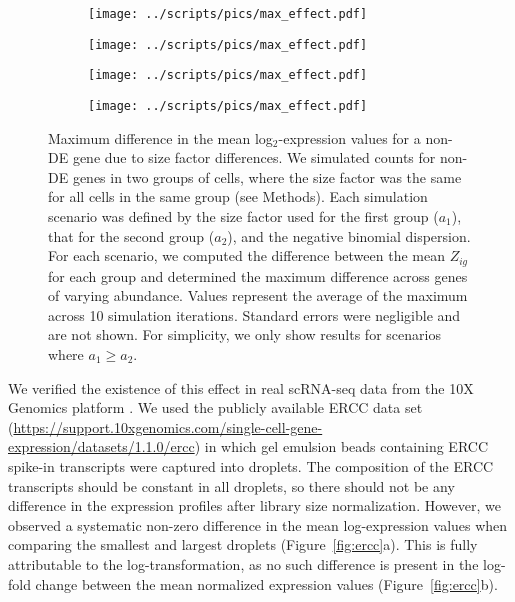 \documentclass[10pt,letterpaper]{article}
\begin{document}
\begin{figure}[btp]
\centering
\begin{subfigure}[b]{0.49\textwidth}
    \texttt{[image: ../scripts/pics/max\_effect.pdf]}
    \caption{}
\end{subfigure}
\begin{subfigure}[b]{0.49\textwidth}
    \texttt{[image: ../scripts/pics/max\_effect.pdf]}
    \caption{}
\end{subfigure}
\begin{subfigure}[b]{0.49\textwidth}
    \texttt{[image: ../scripts/pics/max\_effect.pdf]}
    \caption{}
\end{subfigure}
\begin{subfigure}[b]{0.49\textwidth}
    \texttt{[image: ../scripts/pics/max\_effect.pdf]}
    \caption{}
\end{subfigure}
\caption{Maximum difference in the mean log$_2$-expression values for a non-DE gene due to size factor differences.
We simulated counts for non-DE genes in two groups of cells, where the size factor was the same for all cells in the same group (see Methods).
Each simulation scenario was defined by the size factor used for the first group ($a_1$), that for the second group ($a_2$), and the negative binomial dispersion.
For each scenario, we computed the difference between the mean $Z_{ig}$ for each group and determined the maximum difference across genes of varying abundance.
Values represent the average of the maximum across 10 simulation iterations.
Standard errors were negligible and are not shown.
For simplicity, we only show results for scenarios where $a_1 \ge a_2$.
}
\label{fig:maxeffect}
\end{figure}

We verified the existence of this effect in real scRNA-seq data from the 10X Genomics platform \cite{zheng2017massively}.
We used the publicly available ERCC data set (\url{https://support.10xgenomics.com/single-cell-gene-expression/datasets/1.1.0/ercc}) in which gel emulsion beads containing ERCC spike-in transcripts were captured into droplets.
The composition of the ERCC transcripts should be constant in all droplets, so there should not be any difference in the expression profiles after library size normalization.
However, we observed a systematic non-zero difference in the mean log-expression values when comparing the smallest and largest droplets (Figure~\ref{fig:ercc}a).
This is fully attributable to the log-transformation, as no such difference is present in the log-fold change between the mean normalized expression values (Figure~\ref{fig:ercc}b).
\end{document}
